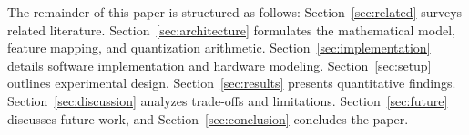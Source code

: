 The remainder of this paper is structured as follows: Section~\ref{sec:related} surveys related literature. Section~\ref{sec:architecture} formulates the mathematical model, feature mapping, and quantization arithmetic. Section~\ref{sec:implementation} details software implementation and hardware modeling. Section~\ref{sec:setup} outlines experimental design. Section~\ref{sec:results} presents quantitative findings. Section~\ref{sec:discussion} analyzes trade-offs and limitations. Section~\ref{sec:future} discusses future work, and Section~\ref{sec:conclusion} concludes the paper.
